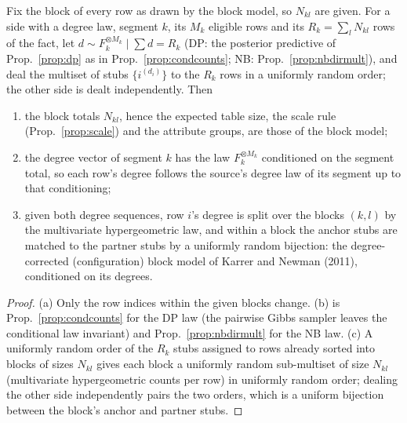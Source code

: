 \begin{proposition}\label{prop:linkdeg}
Fix the block of every row as drawn by the block model, so $N_{kl}$ are given. For a side with a degree law, segment $k$, its $M_k$ eligible rows and its $R_k=\sum_l N_{kl}$ rows of the fact, let $d\sim F_k^{\otimes M_k}\mid\sum d=R_k$ (DP: the posterior predictive of Prop.~\ref{prop:dp} as in Prop.~\ref{prop:condcounts}; NB: Prop.~\ref{prop:nbdirmult}), and deal the multiset of stubs $\{i^{(d_i)}\}$ to the $R_k$ rows in a uniformly random order; the other side is dealt independently. Then
\begin{enumerate}
\item[(a)] the block totals $N_{kl}$, hence the expected table size, the scale rule (Prop.~\ref{prop:scale}) and the attribute groups, are those of the block model;
\item[(b)] the degree vector of segment $k$ has the law $F_k^{\otimes M_k}$ conditioned on the segment total, so each row's degree follows the source's degree law of its segment up to that conditioning;
\item[(c)] given both degree sequences, row $i$'s degree is split over the blocks $(k,l)$ by the multivariate hypergeometric law, and within a block the anchor stubs are matched to the partner stubs by a uniformly random bijection: the degree-corrected (configuration) block model of Karrer and Newman (2011), conditioned on its degrees.
\end{enumerate}
\end{proposition}
\begin{proof}
(a) Only the row indices within the given blocks change. (b) is Prop.~\ref{prop:condcounts} for the DP law (the pairwise Gibbs sampler leaves the conditional law invariant) and Prop.~\ref{prop:nbdirmult} for the NB law. (c) A uniformly random order of the $R_k$ stubs assigned to rows already sorted into blocks of sizes $N_{kl}$ gives each block a uniformly random sub-multiset of size $N_{kl}$ (multivariate hypergeometric counts per row) in uniformly random order; dealing the other side independently pairs the two orders, which is a uniform bijection between the block's anchor and partner stubs.
\end{proof}

